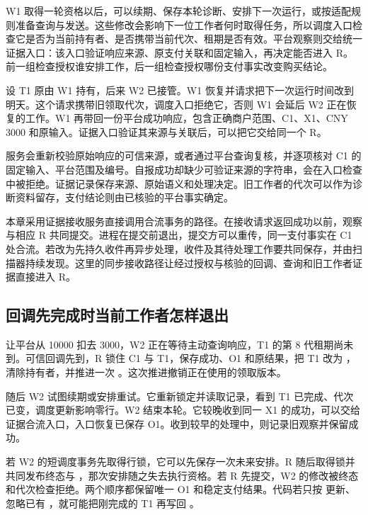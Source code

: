 W1 取得一轮资格以后，可以续期、保存本轮诊断、安排下一次运行，或按适配规则准备查询与发送。这些修改会影响下一位工作者何时取得任务，所以调度入口检查它是否为当前持有者、是否携带当前代次、租期是否有效。平台观察则交给统一证据入口：该入口验证响应来源、原支付关联和固定输入，再决定能否进入 R。前一组检查授权谁安排工作，后一组检查授权哪份支付事实改变购买结论。

设 T1 原由 W1 持有，后来 W2 已接管。W1 恢复并请求把下一次运行时间改到明天。这个请求携带旧领取代次，调度入口拒绝它，否则 W1 会延后 W2 正在恢复的工作。W1 再带回一份平台成功响应，包含正确商户范围、C1、X1、CNY 3000 和原输入。证据入口验证其来源与关联后，可以把它交给同一个 R。

服务会重新校验原始响应的可信来源，或者通过平台查询复核，并逐项核对 C1 的固定输入、平台范围及编号。自报成功却缺少可验证来源的字符串，会在入口检查中被拒绝。证据记录保存来源、原始语义和处理决定。旧工作者的代次可以作为诊断资料留存，支付结论则由已核验的平台事实确定。


本章采用证据接收服务直接调用合流事务的路径。在接收请求返回成功以前，观察与相应 R 共同提交。进程在提交前退出，提交方可以重传，同一支付事实在 C1 处合流。若改为先持久收件再异步处理，收件及其待处理工作要共同保存，并由扫描器持续发现。这里的同步接收路径让经过授权与核验的回调、查询和旧工作者证据直接进入 R。

\subsection*{回调先完成时当前工作者怎样退出}

让平台从 10000 扣去 3000，W2 正在等待主动查询响应，T1 的第 8 代租期尚未到。可信回调先到，R 锁住 C1 与 T1，保存成功、O1 和原结果，把 T1 改为 ，清除持有者，并推进一次 。这次推进撤销正在使用的领取版本。

随后 W2 试图续期或安排重试。它重新锁定并读取记录，看到 T1 已完成、代次已变，调度更新影响零行。W2 结束本轮。它较晚收到同一 X1 的成功，可以交给证据合流入口，入口恢复已保存 O1。收到较早的处理中，则记录旧观察并保留成功。


若 W2 的短调度事务先取得行锁，它可以先保存一次未来安排。R 随后取得锁并共同发布终态与 ，那次安排随之失去执行资格。若 R 先提交，W2 的修改被终态和代次检查拒绝。两个顺序都保留唯一 O1 和稳定支付结果。代码若只按  更新、忽略已有 ，就可能把刚完成的 T1 再写回 。

